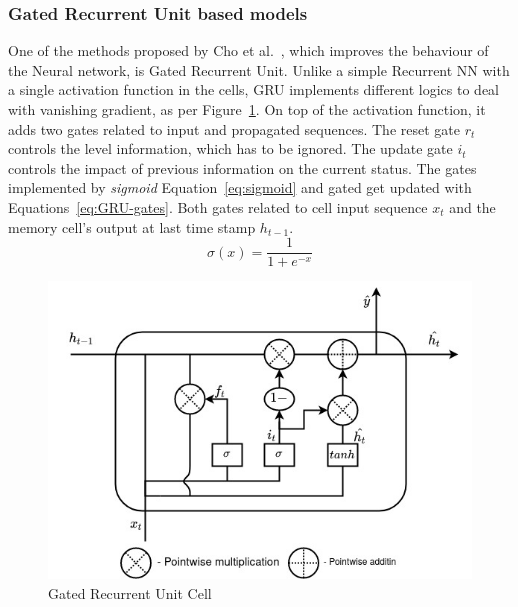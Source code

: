 \subsubsection{Gated Recurrent Unit based models} \label{subsub:gru}
One of the methods proposed by Cho et al.~\cite{GRU_cho_properties_2014}, which improves the behaviour of the Neural network, is Gated Recurrent Unit.
Unlike a simple Recurrent NN with a single activation function in the cells, GRU implements different logics to deal with vanishing gradient, as per Figure~\ref{fig:GRU-cell}.
On top of the activation function, it adds two gates related to input and propagated sequences.
The reset gate $r_t$ controls the level information, which has to be ignored.
The update gate $i_t$ controls the impact of previous information on the current status.
The gates implemented by \textit{sigmoid} Equation~\ref{eq:sigmoid} and gated get updated with Equations~\ref{eq:GRU-gates}.
Both gates related to cell input sequence $x_t$ and the memory cell's output at last time stamp $h_{t-1}$.
\begin{equation}
    \sigma(x) = \frac{1}{1+e^{-x}}
    \label{eq:sigmoid}
\end{equation}
\begin{figure}[ht]%
    \centering
    \includegraphics[width=\linewidth]{II_Body/GRU/images/GRU.jpg}
    \caption{Gated Recurrent Unit Cell}
    \label{fig:GRU-cell}
\end{figure}
